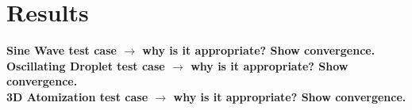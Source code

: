 \chapter{Results} \label{CH:results}
\textbf{Sine Wave test case  $\rightarrow$ why is it appropriate? Show convergence.\\
	Oscillating Droplet test case $\rightarrow$ why is it appropriate? Show convergence.\\
	3D Atomization test case $\rightarrow$ why is it appropriate? Show convergence.}\\